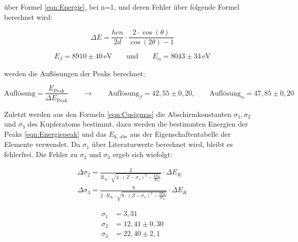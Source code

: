 \documentclass[titlepage = firstcover]{scrartcl}
\begin{document}
            \noindent
            über Formel \ref{eqn:Energie}, bei n=1, und deren Fehler über folgende Formel berechnet wird:

            \begin{equation*}
              \Delta E = \frac{hcn}{2d} \cdot \frac{2 \cdot \cos(\theta)}{\cos(2\theta)-1}
            \end{equation*}
            
            \begin{equation}
              E_{\beta} = 8910 \pm 40 \, \text{eV} \qquad \text{und} \qquad E_{\alpha} = 8043 \pm 34\, \text{eV}
              \label{eqn:Energiepeak}
            \end{equation}
            
            \noindent
            werden die Auflösungen der Peaks berechnet:

            \begin{equation}
              \text{Auflösung} = \frac{E_{\text{Peak}}}{\Delta E_{\text{Peak}}} \qquad \longrightarrow \qquad \text{Auflösung}_{\beta} = 42,55 \pm 0,20 , \qquad \text{Auflösung}_{\alpha} = 47,85 \pm 0,20
            \end{equation}
            
            \noindent
            Zuletzt werden aus den Formeln \ref{eqn:Cusigmas} die Abschirmkonstanten $\sigma_1, \sigma_2$ und $\sigma_3$ des Kupferatoms bestimmt, dazu werden die bestimmten Energien der Peaks
            \ref{eqn:Energiepeak} und das $E_{\text{k, abs}}$ aus der Eigenschaftentabelle der Elemente verwendet. Da $\sigma_1$ über Literaturwerte berechnet wird, bleibt es fehlerfrei. Die Fehler zu
            $\sigma_2$ und $\sigma_3$ ergeb sich wiefolgt:

            \begin{align*}
              \Delta \sigma_2 = \frac{2}{R_{\infty} \cdot \sqrt{4 \cdot \left(Z - \sigma_1 \right)^2 - \frac{4E_K}{R_{\infty}}}} \cdot \Delta E_K \\
              \Delta \sigma_3 = \frac{9}{2 \cdot R_{\infty} \cdot \sqrt{9 \cdot \left(Z - \sigma_1 \right)^2 - \frac{9E_K}{R_{\infty}}}} \cdot \Delta E_K
            \end{align*}
            
            \begin{align*}
              \sigma_1 &= 3,31 \\
              \sigma_2 &= 12,41 \pm 0,30 \\
              \sigma_3 &= 22,40 \pm 2,1
            \end{align*}
            \noindent
\end{document}
